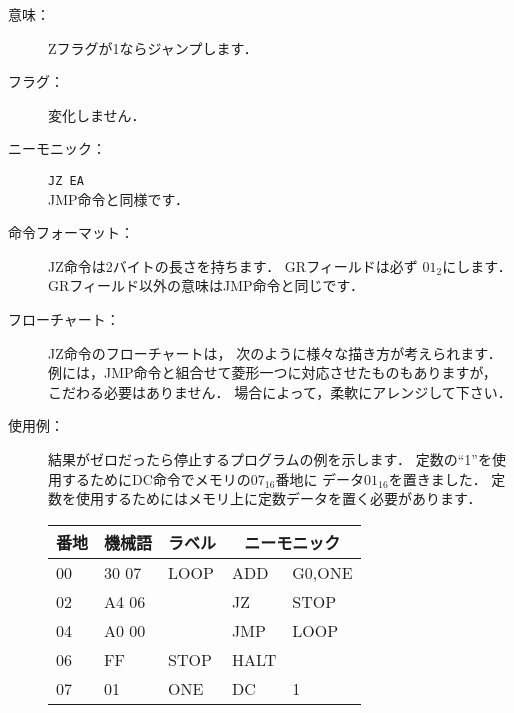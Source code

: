 \begin{description}
\item[意味：]Zフラグが1ならジャンプします．

\item[フラグ：]変化しません．

\item[ニーモニック：]\texttt{JZ EA} \\
  JMP命令と同様です．

\item[命令フォーマット：]JZ命令は2バイトの長さを持ちます．
  GRフィールドは必ず $01_2$にします．
  GRフィールド以外の意味はJMP命令と同じです．


\item[フローチャート：]JZ命令のフローチャートは，
  次のように様々な描き方が考えられます．
  例には，JMP命令と組合せて菱形一つに対応させたものもありますが，
  こだわる必要はありません．
  場合によって，柔軟にアレンジして下さい．

  \begin{center}
  \end{center}

\item[使用例：]
  結果がゼロだったら停止するプログラムの例を示します．
  定数の``1''を使用するためにDC命令でメモリの$07_{16}$番地に
  データ$01_{16}$を置きました．
  定数を使用するためにはメモリ上に定数データを置く必要があります．

  {\ttfamily\small\begin{center}
    \begin{tabular}{|l|l|l|l l|} \hline
      番地 & 機械語 & ラベル & \multicolumn{2}{|c|}{ニーモニック} \\
      \hline
      00 & 30 07 & LOOP & ADD  & G0,ONE  \\
      02 & A4 06 &      & JZ   & STOP    \\
      04 & A0 00 &      & JMP  & LOOP    \\
      06 & FF    & STOP & HALT &         \\
      07 & 01    & ONE  & DC   & 1       \\
      \hline
    \end{tabular}
  \end{center}}
\end{description}

